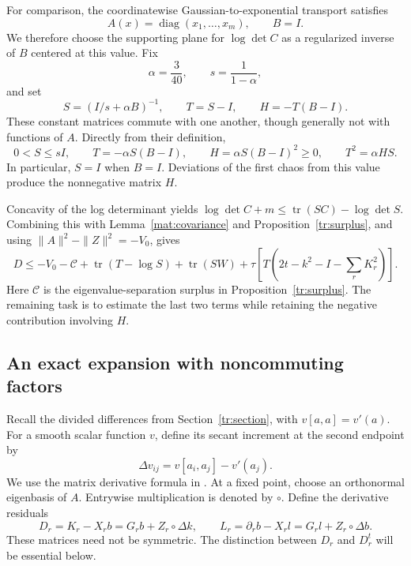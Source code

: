 \documentclass[11pt]{article}
\theoremstyle{definition}
\theoremstyle{remark}
\numberwithin{equation}{section}
\begin{document}
For comparison, the coordinatewise Gaussian-to-exponential transport
satisfies
\[
 A(x)=\operatorname{diag}(x_1,\ldots,x_m),\qquad B=I.
\]
We therefore choose the supporting plane for $\log\det C$ as a
regularized inverse of $B$ centered at this value.  Fix
\begin{equation}\label{mat:dual-constants}
 \alpha=\frac{3}{40},\qquad s=\frac1{1-\alpha},
\end{equation}
and set
\begin{equation}\label{mat:dual-matrices}
 S=(I/s+\alpha B)^{-1},\qquad T=S-I,
 \qquad H=-T(B-I).
\end{equation}
These constant matrices commute with one another, though generally not
with functions of $A$.  Directly from their definition,
\begin{equation}\label{mat:dual-relations}
 0<S\le s I,\qquad T=-\alpha S(B-I),\qquad
 H=\alpha S(B-I)^2\ge0,\qquad T^2=\alpha HS.
\end{equation}
In particular, $S=I$ when $B=I$.  Deviations of the first chaos from
this value produce the nonnegative matrix $H$.

Concavity of the log determinant yields
$\log\det C+m\le\operatorname{tr}(SC)-\log\det S$.  Combining this with
Lemma~\ref{mat:covariance} and Proposition~\ref{tr:surplus}, and using
$\|A\|^2-\|Z\|^2=-V_0$, gives
\begin{equation}\label{mat:deficit-reduction}
 \mathcal{} D\le -V_0-\mathcal C+\operatorname{tr}(T-\log S)+\operatorname{tr}(SW)
   +\tau\left[T\left(2t-k^2-I-\sum_rK_r^2\right)\right].
\end{equation}
Here $\mathcal C$ is the eigenvalue-separation surplus in
Proposition~\ref{tr:surplus}.  The remaining task is to estimate the last
two terms while retaining the negative contribution involving $H$.

\subsection{An exact expansion with noncommuting factors}

Recall the divided differences from Section~\ref{tr:section}, with
$v[a,a]=v'(a)$.  For a smooth scalar function $v$, define its secant
increment at the second endpoint by
\[
 \Delta v_{ij}=v[a_i,a_j]-v'(a_j).
\]
We use the matrix derivative formula in
\cite[Section~2.4]{Noferini2017}.
At a fixed point, choose an orthonormal eigenbasis of $A$.  Entrywise
multiplication is denoted by $\circ$.  Define the derivative residuals
\begin{equation}\label{mat:residuals}
 D_r=K_r-X_rb=G_rb+Z_r\circ\Delta k,\qquad
 L_r=\partial_rb-X_rl=G_rl+Z_r\circ\Delta b.
\end{equation}
These matrices need not be symmetric.  The distinction between $D_r$
and $D_r^t$ will be essential below.
\end{document}
